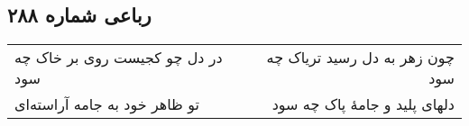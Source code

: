 \begin{center}
\section*{رباعی شماره ۲۸۸}
\label{sec:sh288}
\begin{longtable}{l p{0.5cm} r}
در دل چو کجیست روی بر خاک چه سود
&&
چون زهر به دل رسید تریاک چه سود
\\
تو ظاهر خود به جامه آراسته‌ای
&&
دلهای پلید و جامهٔ پاک چه سود
\\
\end{longtable}
\end{center}
